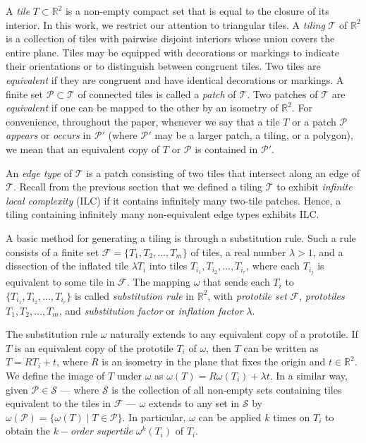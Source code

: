 \noindent A \textit{tile} $T \subset \mathbb{R}^2$ is a non-empty compact set that is equal to the closure of its interior. In this work, we restrict our attention to triangular tiles. A \textit{tiling} $\mathcal{T}$ of $\mathbb{R}^2$ is a collection of tiles with pairwise disjoint interiors whose union covers the entire plane. Tiles may be equipped with decorations or markings to indicate their orientations or to distinguish between congruent tiles. Two tiles are \textit{equivalent} if they are congruent and have identical decorations or markings. A finite set $\mathcal{P} \subset \mathcal{T}$ of connected tiles is called a \textit{patch} of $\mathcal{T}$. Two patches of $\mathcal{T}$ are \textit{equivalent} if one can be mapped to the other by an isometry of $\mathbb{R}^2$. For convenience, throughout the paper, whenever we say that a tile $T$ or a patch $\mathcal{P}$ \textit{appears} or \textit{occurs} in $\mathcal{P}'$ (where $\mathcal{P}'$ may be a larger patch, a tiling, or a polygon), we mean that an equivalent copy of $T$ or $\mathcal{P}$ is contained in $\mathcal{P}'$.

An \textit{edge type} of $\mathcal{T}$ is a patch consisting of two tiles that intersect along an edge of $\mathcal{T}$. Recall from the previous section that we defined a tiling $\mathcal{T}$ to exhibit \textit{infinite local complexity} (ILC) if it contains infinitely many two-tile patches. Hence, a tiling containing infinitely many non-equivalent edge types exhibits ILC.

	A basic method for generating a tiling is through a substitution rule. Such a rule consists of a finite set $\mathcal{F}=\{T_1,T_2,…,T_m\}$ of tiles, a real number $\lambda>1$, and a dissection of the inflated tile $\lambda T_{i}$ into tiles $T_{i_1},T_{i_2},…,T_{i_r}$, where each $T_{i_j}$ is equivalent to some tile in $\mathcal{F}$. The mapping $\omega$ that sends each $T_{i}$ to $\{T_{i_1},T_{i_2},…,T_{i_r} \}$ is called \textit{substitution rule} in $\mathbb{R}^2$, with \textit{prototile set} $\mathcal{F}$,  \textit{prototiles} $T_1,T_2,…,T_m$, and \textit{substitution factor} or \textit{inflation factor} $\lambda$. 
	
	The substitution rule $\omega$ naturally extends to any equivalent copy of a prototile. If $T$ is an equivalent copy of the prototile $T_i$ of $\omega$, then $T$ can be written as $T=RT_i+t$, where $R$ is an isometry in the plane that fixes the origin and $t \in \mathbb{R}^2$. We define the image of $T$ under $\omega$ as  $\omega(T)=R\omega(T_i )+ \lambda t$. In a similar way, given $\mathcal{P} \in \mathcal{S}$ --- where $\mathcal{S}$ is the collection of all non-empty sets containing tiles equivalent to the tiles in $\mathcal{F}$ --- $\omega$ extends to any set in $\mathcal{S}$ by $\omega(\mathcal{P})=\{\omega(T)\mid T\in \mathcal{P}\}$. In particular, $\omega$ can be applied $k$ times on $T_i$ to obtain the $k-$\textit{order supertile} $\omega^k (T_i)$ of $T_i$. 

